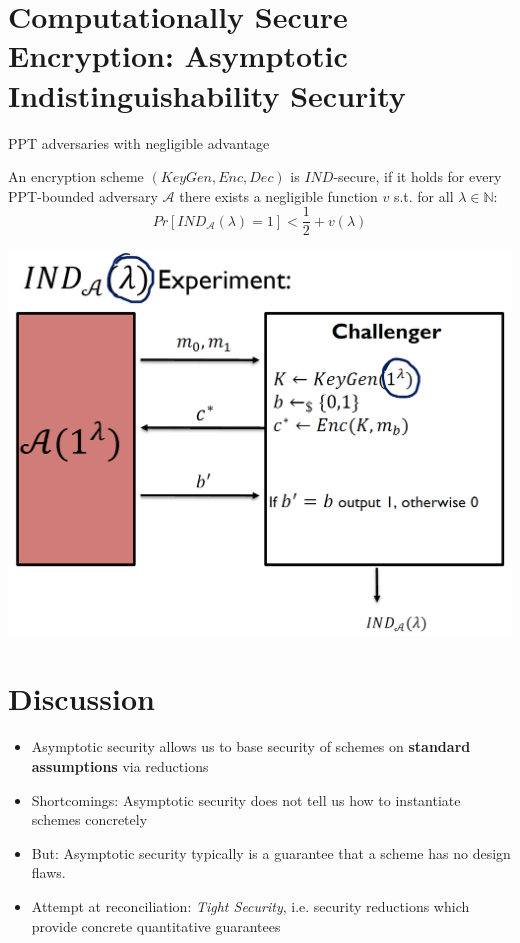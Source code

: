 	\section{Computationally Secure Encryption: Asymptotic Indistinguishability Security}
		PPT adversaries with negligible advantage
		\begin{definition}
	    	An encryption scheme $(KeyGen,Enc,Dec)$ is $IND$-secure, if it holds for every PPT-bounded adversary $\mathcal{A}$ 
	    	there exists a negligible function $v$ s.t. for all $\lambda \in \mathbb{N}$:
	    		$$Pr[IND_{\mathcal{A}}(\lambda)=1] < \frac{1}{2} + v(\lambda)$$
		\end{definition}
		\begin{center}
			\includegraphics[width=140mm]{Graphics/Basics of Private Key Encryption/AsymptoticIndistinguishabilitySecurity.png}\newline
		\end{center}
	
	\section{Discussion}
		\begin{itemize}
			\item Asymptotic security allows us to base security of schemes on \textbf{standard assumptions} via reductions
			\item Shortcomings: Asymptotic security does not tell us how to instantiate schemes concretely
			\item But: Asymptotic security typically is a guarantee that a scheme has no design flaws.
			\item Attempt at reconciliation: \textit{Tight Security}, i.e. security reductions which provide concrete quantitative guarantees
		\end{itemize}
	

